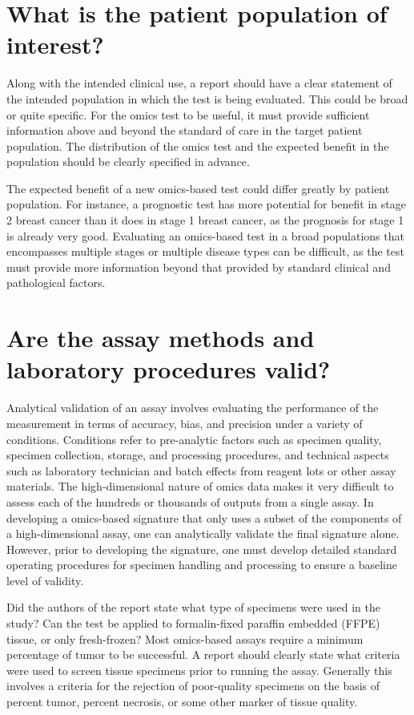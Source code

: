 \documentclass[11pt]{article}
\begin{document}
\section{What is the patient population of
interest?}\label{what-is-the-patient-population-of-interest}

Along with the intended clinical use, a report should have a clear
statement of the intended population in which the test is being
evaluated. This could be broad or quite specific. For the omics test to
be useful, it must provide sufficient information above and beyond the
standard of care in the target patient population. The distribution of
the omics test and the expected benefit in the population should be
clearly specified in advance.

The expected benefit of a new omics-based test could differ greatly by
patient population. For instance, a prognostic test has more potential
for benefit in stage 2 breast cancer than it does in stage 1 breast
cancer, as the prognosis for stage 1 is already very good. Evaluating an
omics-based test in a broad populations that encompasses multiple stages
or multiple disease types can be difficult, as the test must provide
more information beyond that provided by standard clinical and
pathological factors.

\section{Are the assay methods and laboratory procedures
valid?}\label{are-the-assay-methods-and-laboratory-procedures-valid}

Analytical validation of an assay involves evaluating the performance of
the measurement in terms of accuracy, bias, and precision under a
variety of conditions. Conditions refer to pre-analytic factors such as
specimen quality, specimen collection, storage, and processing
procedures, and technical aspects such as laboratory technician and
batch effects from reagent lots or other assay materials. The
high-dimensional nature of omics data makes it very difficult to assess
each of the hundreds or thousands of outputs from a single assay. In
developing a omics-based signature that only uses a subset of the
components of a high-dimensional assay, one can analytically validate
the final signature alone. However, prior to developing the signature,
one must develop detailed standard operating procedures for specimen
handling and processing to ensure a baseline level of validity.

Did the authors of the report state what type of specimens were used in
the study? Can the test be applied to formalin-fixed paraffin embedded
(FFPE) tissue, or only fresh-frozen? Most omics-based assays require a
minimum percentage of tumor to be successful. A report should clearly
state what criteria were used to screen tissue specimens prior to
running the assay. Generally this involves a criteria for the rejection
of poor-quality specimens on the basis of percent tumor, percent
necrosis, or some other marker of tissue quality.
\end{document}
